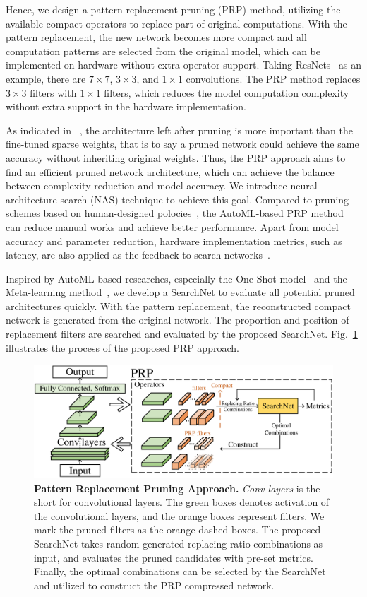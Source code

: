 \documentclass[journal,article,submit,pdftex,moreauthors]{Definitions/mdpi}
\begin{document}
Hence, we design a pattern replacement pruning (PRP) method, utilizing the available compact operators to replace part of original computations. With the pattern replacement, the new network becomes more compact and all computation patterns are selected from the original model, which can be implemented on hardware without extra operator support. Taking ResNets~\cite{M19} as an example, there are $7\times 7$, $3\times 3$, and $1\times 1$ convolutions. The PRP method replaces $3\times 3$ filters with $1\times 1$ filters, which reduces the model computation complexity without extra support in the hardware implementation.

As indicated in ~\cite{lottery}, the architecture left after pruning is more important than the fine-tuned sparse weights, that is to say a pruned network could achieve the same accuracy without inheriting original weights. Thus, the PRP approach aims to find an efficient pruned network architecture, which can achieve the balance between complexity reduction and model accuracy. We introduce neural architecture search (NAS) technique to achieve this goal. Compared to pruning schemes based on human-designed polocies~\cite{M22}, the AutoML-based PRP method can reduce manual works and achieve better performance. Apart from model accuracy and parameter reduction, hardware implementation metrics, such as latency, are also applied as the feedback to search networks~\cite{M21}. 

Inspired by AutoML-based researches, especially the One-Shot model~\cite{M5,OFA} and the Meta-learning method~\cite{Mself}, we develop a SearchNet to evaluate all potential pruned architectures quickly. With the pattern replacement, the reconstructed compact network is generated from the original network. The proportion and position of replacement filters are searched and evaluated by the proposed SearchNet. Fig.~\ref{fig:PRP} illustrates the process of the proposed PRP approach.

\begin{figure} [t]
	\centering
	\includegraphics[width=13cm]{figs/overall.pdf}
	\caption{\textbf{Pattern Replacement Pruning Approach.} \textit{Conv layers} is the short for convolutional layers. The green boxes denotes activation of the convolutional layers, and the orange boxes represent filters. We mark the pruned filters as the orange dashed boxes. The proposed SearchNet takes random generated replacing ratio combinations as input, and evaluates the pruned candidates with pre-set metrics. Finally, the optimal combinations can be selected by the SearchNet and utilized to construct the PRP compressed network.}
	\label{fig:PRP}
\end{figure}
\end{document}
